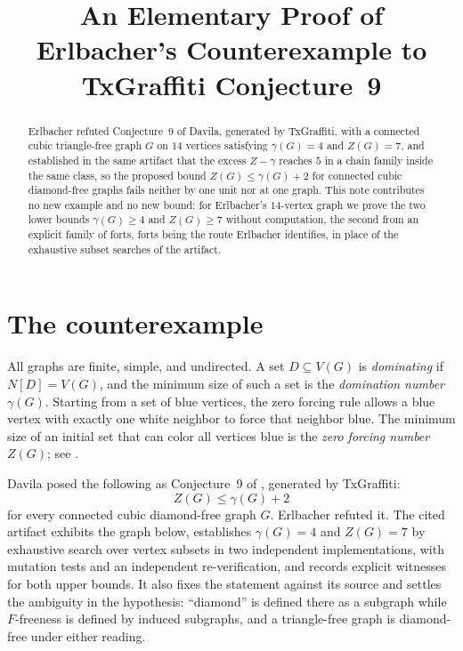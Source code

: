 \documentclass[11pt]{amsart}
\title[An elementary proof of Erlbacher's counterexample]
{An Elementary Proof of Erlbacher's Counterexample to TxGraffiti Conjecture~9}
\date{}
\begin{document}
\begin{abstract}
Erlbacher refuted Conjecture~9 of Davila, generated by TxGraffiti, with a
connected cubic triangle-free graph $G$ on $14$ vertices satisfying
$\gamma(G)=4$ and $Z(G)=7$, and established in the same artifact that the
excess $Z-\gamma$ reaches $5$ in a chain family inside the same class, so the
proposed bound $Z(G)\leq\gamma(G)+2$ for connected cubic diamond-free graphs
fails neither by one unit nor at one graph.  This note contributes no new
example and no new bound: for Erlbacher's $14$-vertex graph we prove the two
lower bounds $\gamma(G)\geq4$ and $Z(G)\geq7$ without computation, the second from an explicit family of forts, forts being the route Erlbacher identifies, in place
of the exhaustive subset searches of the artifact.
\end{abstract}

\maketitle

\section{The counterexample}

All graphs are finite, simple, and undirected.  A set $D\subseteq V(G)$ is
\emph{dominating} if $N[D]=V(G)$, and the minimum size of such a set is the
\emph{domination number} $\gamma(G)$.  Starting from a set of blue vertices,
the zero forcing rule allows a blue vertex with exactly one white neighbor to
force that neighbor blue.  The minimum size of an initial set that can color
all vertices blue is the \emph{zero forcing number} $Z(G)$; see
\cite{AIM2008}.

Davila posed the following as Conjecture~9 of \cite{Davila2024}, generated by
TxGraffiti:
\begin{equation}\label{eq:conjecture}
  Z(G)\leq \gamma(G)+2
\end{equation}
for every connected cubic diamond-free graph $G$.  Erlbacher
\cite{Erlbacher2026} refuted it.  The cited artifact exhibits the graph below,
establishes $\gamma(G)=4$ and $Z(G)=7$ by exhaustive search over vertex
subsets in two independent implementations, with mutation tests and an
independent re-verification, and records explicit witnesses for both upper
bounds.  It also fixes the statement against its source and settles the
ambiguity in the hypothesis: ``diamond'' is defined there as a subgraph while
$F$-freeness is defined by induced subgraphs, and a triangle-free graph is
diamond-free under either reading.
\end{document}
